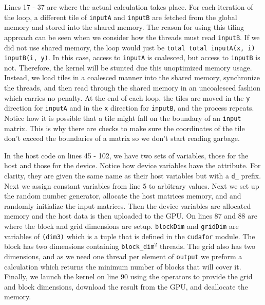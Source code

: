 \documentclass[12pt]{report}
\begin{document}
Lines 17 - 37 are where the actual calculation takes place. For each iteration of the loop, a different tile of \texttt{inputA} and \texttt{inputB} are fetched from the global memory and stored into the shared memory. The reason for using this tiling approach can be seen when we consider how the threads must read \texttt{inputB}. If we did not use shared memory, the loop would just be \texttt{total {\color{myyellow}{=}} total {\color{myyellow}{+}} inputA(x, i) {\color{myyellow}{*}} inputB(i, y)}. In this case, access to \texttt{inputA} is coalesced, but access to \texttt{inputB} is not. Therefore, the kernel will be stunted due this unoptimized memory usage. Instead, we load tiles in a coalesced manner into the shared memory, synchronize the threads, and then read through the shared memory in an uncoalesced fashion which carries no penalty. At the end of each loop, the tiles are moved in the \texttt{y} direction for \texttt{inputA} and in the \texttt{x} direction for \texttt{inputB}, and the process repeats. Notice how it is possible that a tile might fall on the boundary of an \texttt{input} matrix. This is why there are checks to make sure the coordinates of the tile don't exceed the boundaries of a matrix so we don't start reading garbage.

In the host code on lines 45 - 102, we have two sets of variables, those for the host and those for the device. Notice how device variables have the \texttt{{\color{mygreen}{device}}} attribute. For clarity, they are given the same name as their host variables but with a \texttt{d\_} prefix. Next we assign constant variables from line 5 to arbitrary values. Next we set up the random number generator, allocate the host matrices memory, and and randomly initialize the input matrices. Then the device variables are allocated memory and the host data is then uploaded to the GPU. On lines 87 and 88 are where the block and grid dimensions are setup. \texttt{blockDim} and \texttt{gridDim} are variables of \texttt{{\color{mygreen}{type}}(dim3)} which is a tuple that is defined in the \texttt{cudafor} module. The block has two dimensions containing \texttt{block\_dim}$^{2}$ threads. The grid also has two dimensions, and as we need one thread per element of \texttt{output} we preform a calculation which returns the minimum number of blocks that will cover it. Finally, we launch the kernel on line 90 using the \texttt{\color{myyellow}{<<< >>>}} operators to provide the grid and block dimensions, download the result from the GPU, and deallocate the memory.
\end{document}
